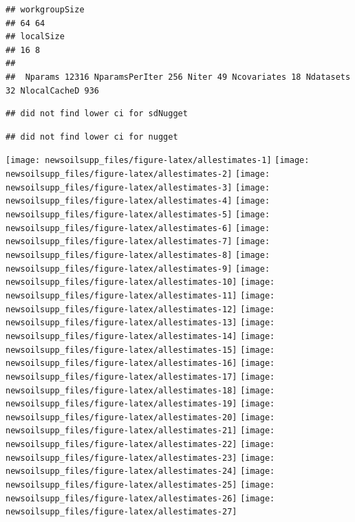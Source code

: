\documentclass[
]{article}
\newenvironment{Shaded}{\begin{snugshade}}{\end{snugshade}}
\newcommand{\DecValTok}[1]{\textcolor[rgb]{0.00,0.00,0.81}{#1}}
\newcommand{\FunctionTok}[1]{\textcolor[rgb]{0.13,0.29,0.53}{\textbf{#1}}}
\newcommand{\NormalTok}[1]{#1}
\newcommand{\OtherTok}[1]{\textcolor[rgb]{0.56,0.35,0.01}{#1}}
\newcommand{\SpecialCharTok}[1]{\textcolor[rgb]{0.81,0.36,0.00}{\textbf{#1}}}
\begin{document}
\begin{verbatim}
## workgroupSize
## 64 64
## localSize
## 16 8
## 
##  Nparams 12316 NparamsPerIter 256 Niter 49 Ncovariates 18 Ndatasets 32 NlocalCacheD 936
\end{verbatim}

\begin{verbatim}
## did not find lower ci for sdNugget
\end{verbatim}

\begin{verbatim}
## did not find lower ci for nugget
\end{verbatim}

\begin{Shaded}
\end{Shaded}

\texttt{[image: newsoilsupp\_files/figure-latex/allestimates-1]}
\texttt{[image: newsoilsupp\_files/figure-latex/allestimates-2]}
\texttt{[image: newsoilsupp\_files/figure-latex/allestimates-3]}
\texttt{[image: newsoilsupp\_files/figure-latex/allestimates-4]}
\texttt{[image: newsoilsupp\_files/figure-latex/allestimates-5]}
\texttt{[image: newsoilsupp\_files/figure-latex/allestimates-6]}
\texttt{[image: newsoilsupp\_files/figure-latex/allestimates-7]}
\texttt{[image: newsoilsupp\_files/figure-latex/allestimates-8]}
\texttt{[image: newsoilsupp\_files/figure-latex/allestimates-9]}
\texttt{[image: newsoilsupp\_files/figure-latex/allestimates-10]}
\texttt{[image: newsoilsupp\_files/figure-latex/allestimates-11]}
\texttt{[image: newsoilsupp\_files/figure-latex/allestimates-12]}
\texttt{[image: newsoilsupp\_files/figure-latex/allestimates-13]}
\texttt{[image: newsoilsupp\_files/figure-latex/allestimates-14]}
\texttt{[image: newsoilsupp\_files/figure-latex/allestimates-15]}
\texttt{[image: newsoilsupp\_files/figure-latex/allestimates-16]}
\texttt{[image: newsoilsupp\_files/figure-latex/allestimates-17]}
\texttt{[image: newsoilsupp\_files/figure-latex/allestimates-18]}
\texttt{[image: newsoilsupp\_files/figure-latex/allestimates-19]}
\texttt{[image: newsoilsupp\_files/figure-latex/allestimates-20]}
\texttt{[image: newsoilsupp\_files/figure-latex/allestimates-21]}
\texttt{[image: newsoilsupp\_files/figure-latex/allestimates-22]}
\texttt{[image: newsoilsupp\_files/figure-latex/allestimates-23]}
\texttt{[image: newsoilsupp\_files/figure-latex/allestimates-24]}
\texttt{[image: newsoilsupp\_files/figure-latex/allestimates-25]}
\texttt{[image: newsoilsupp\_files/figure-latex/allestimates-26]}
\texttt{[image: newsoilsupp\_files/figure-latex/allestimates-27]}
\end{document}
